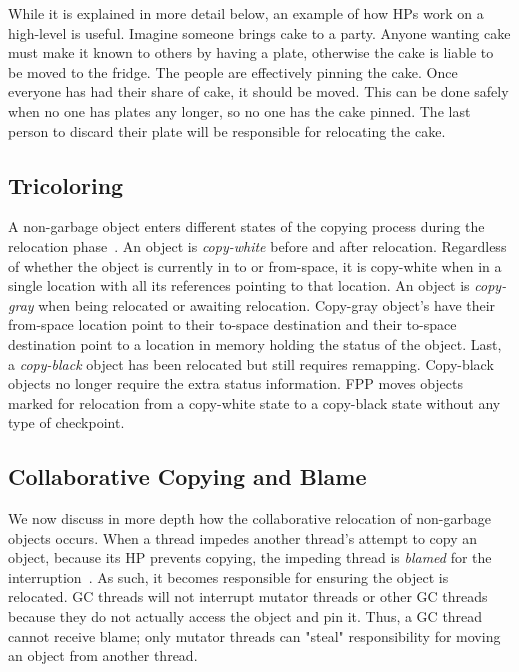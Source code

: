 \documentclass{sig-alternate}
\begin{document}
While it is explained in more detail below, an example of how HPs 
work on a high-level is useful. Imagine someone brings cake to a party. Anyone 
wanting cake must make it known to others by having a plate, otherwise the 
cake is liable to be moved to the fridge. The people are effectively pinning the cake.
Once everyone has had their share of cake, it should be moved. This can
be done safely when no one has plates any longer, so no one has the cake pinned.
The last person to discard their plate will be responsible for relocating the cake.


\subsection{Tricoloring}
\label{sec:fppColoring}

A non-garbage object enters different states of the copying process 
during the relocation phase~\cite{Osterlund:FPP}. An object is
\emph{copy-white} before and after relocation. Regardless of whether the object is
currently in to or from-space, it is copy-white when in a single location with all its
references pointing to that location. An object is \emph{copy-gray} when
being relocated or awaiting relocation. Copy-gray object's have their from-space location
point to their to-space destination and their to-space destination point to a location in
memory holding the status of the object. Last, a \emph{copy-black} object has
been relocated but still requires remapping. Copy-black objects no longer require the extra
status information. FPP moves objects marked for relocation from a copy-white state to
a copy-black state without any type of checkpoint.


\subsection{Collaborative Copying and Blame}
\label{sec:fppCopy}

We now discuss in more depth how the collaborative relocation of 
non-garbage objects occurs. When a thread impedes another thread's
attempt to copy an object, because its HP prevents copying,
the impeding thread is \emph{blamed} for the 
interruption~\cite{Osterlund:FPP}. As such, it becomes responsible for ensuring 
the object is relocated. GC threads will not interrupt
mutator threads or other GC threads because they do not actually access 
the object and pin it. Thus, a GC thread cannot receive blame;
only mutator threads can "steal" responsibility for moving an object
from another thread. 
\end{document}
